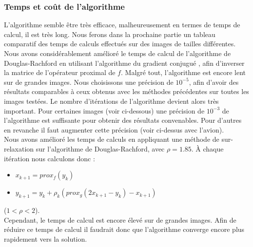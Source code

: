 \subsubsection{Temps et coût de l'algorithme}
L'algorithme semble être très efficace, malheureusement en termes de temps de calcul, il est très long. Nous ferons dans la prochaine partie un tableau comparatif des temps de calculs effectués sur des images de tailles différentes.\\
Nous avons considérablement amélioré le temps de calcul de l'algorithme de Douglas-Rachford en utilisant l'algorithme du gradient conjugué \cite{Gradient}, afin d'inverser la matrice de l'opérateur proximal de $f$. Malgré tout, l'algorithme est encore lent sur de grandes images. Nous choisissons une précision de $10^{-5}$, afin d'avoir des résultats comparables à ceux obtenus avec les méthodes précédentes sur toutes les images testées. Le nombre d'itérations de l'algorithme devient alors très important. Pour certaines images (voir ci-dessous) une précision de $10^{-3}$ de l'algorithme est suffisante pour obtenir des résultats convenables. Pour d'autres en revanche il faut augmenter cette précision (voir ci-dessus avec l'avion).\\
Nous avons amélioré les temps de calculs en appliquant une méthode de sur-relaxation sur l'algorithme de Douglas-Rachford, avec $\rho  =1.85$. À chaque itération nous calculons donc :
\begin{center} 
\begin{itemize}
\item $x_{k+1} = prox_f(y_k)$
\item $y_{k+1} = y_k+\rho_k(prox_g(2x_{k+1}-y_k)-x_{k+1})$
\end{itemize}
\end{center}
($1<\rho<2$).\\
Cependant, le temps de calcul est encore élevé sur de grandes images.
Afin de réduire ce temps de calcul il faudrait donc que l'algorithme converge encore plus rapidement vers la solution. 
